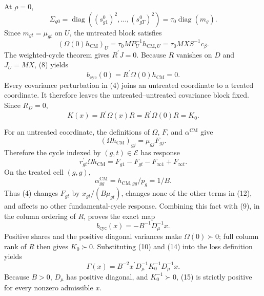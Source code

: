 At \(\rho=0\),
\[
\Sigma_{g0}
=\operatorname{diag}((s^0_{g1})^2,\ldots,(s^0_{gT})^2)
=\tau_0\operatorname{diag}(m_g).                                       \tag{7}
\]
Since \(m_{gt}=\mu_{gt}\) on \(U\), the untreated block satisfies
\[
(\Omega(0)h_{\mathrm{CM}})_U
=\tau_0MP_U^{-1}h_{\mathrm{CM},U}
=\tau_0MX S^{-1}c_\beta.                                                \tag{8}
\]
The weighted-cycle theorem gives \(R^{\prime}J=0\).  Because \(R\) vanishes on \(D\) and \(J_U=MX\), (8) yields
\[
b_{\mathrm{cyc}}(0)=R^{\prime}\Omega(0)h_{\mathrm{CM}}=0.             \tag{9}
\]
Every covariance perturbation in (4) joins an untreated coordinate to a treated coordinate.  It therefore leaves the untreated--untreated covariance block fixed.  Since \(R_D=0\),
\[
K(x)=R^{\prime}\Omega(x)R
=R^{\prime}\Omega(0)R=K_0.                                             \tag{10}
\]

For an untreated coordinate, the definitions of \(\Omega\), \(F\), and \(\alpha^{\mathrm{CM}}\) give
\[
(\Omega h_{\mathrm{CM}})_{gj}=\mu_{gj}F_{gj}.                          \tag{11}
\]
Therefore the cycle indexed by \((g,t)\in\mathcal E\) has response
\[
r_{gt}^{\prime}\Omega h_{\mathrm{CM}}
=F_{g1}-F_{gt}-F_{\infty1}+F_{\infty t}.                               \tag{12}
\]
On the treated cell \((g,g)\),
\[
\alpha^{\mathrm{CM}}_{gg}
=h_{\mathrm{CM},gg}/p_g=1/B.                                           \tag{13}
\]
Thus (4) changes \(F_{gt}\) by \(x_{gt}/(B\mu_{gt})\), changes none of the other terms in (12), and affects no other fundamental-cycle response.  Combining this fact with (9), in the column ordering of \(R\), proves the exact map
\[
b_{\mathrm{cyc}}(x)=-B^{-1}D_\mu^{-1}x.                               \tag{14}
\]
Positive shares and the positive diagonal variances make \(\Omega(0)\succ0\); full column rank of \(R\) then gives \(K_0\succ0\).  Substituting (10) and (14) into the loss definition yields
\[
\Gamma(x)
=B^{-2}x^{\prime}D_\mu^{-1}K_0^{-1}D_\mu^{-1}x.                       \tag{15}
\]
Because \(B>0\), \(D_\mu\) has positive diagonal, and \(K_0^{-1}\succ0\), (15) is strictly positive for every nonzero admissible \(x\).

